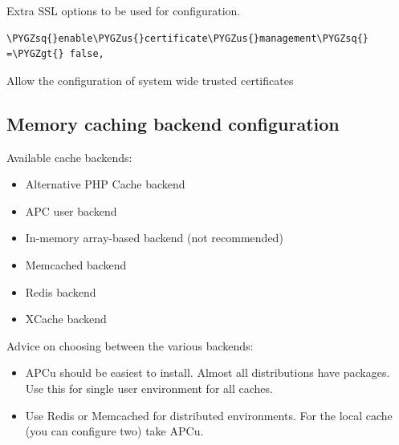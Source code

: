 \documentclass[letterpaper,10pt,english]{sphinxmanual}
\def\PYGZus{\char`\_}
\def\PYGZgt{\char`\>}
\def\PYGZsq{\char`\'}
\begin{document}
Extra SSL options to be used for configuration.

\begin{Verbatim}[commandchars=\\\{\}]
\PYGZsq{}enable\PYGZus{}certificate\PYGZus{}management\PYGZsq{} =\PYGZgt{} false,
\end{Verbatim}

Allow the configuration of system wide trusted certificates


\subsection{Memory caching backend configuration}
\label{configuration_server/config_sample_php_parameters:memory-caching-backend-configuration}
Available cache backends:
\begin{itemize}
\item {} 
        Alternative PHP Cache backend

\item {} 
       APC user backend

\item {} 
 In-memory array-based backend (not recommended)

\item {} 
  Memcached backend

\item {} 
      Redis backend

\item {} 
     XCache backend

\end{itemize}

Advice on choosing between the various backends:
\begin{itemize}
\item {} 
APCu should be easiest to install. Almost all distributions have packages.
Use this for single user environment for all caches.

\item {} 
Use Redis or Memcached for distributed environments.
For the local cache (you can configure two) take APCu.

\end{itemize}
\end{document}
